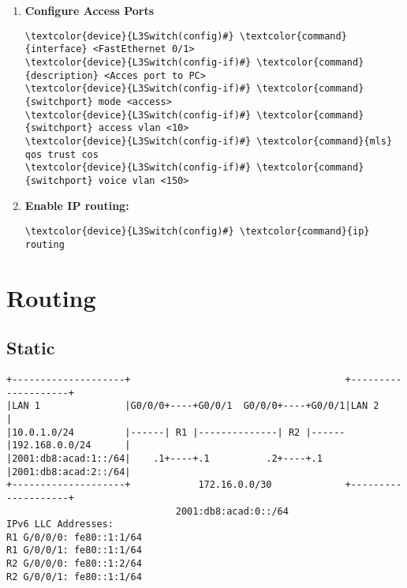 \documentclass[10pt, a4paper, onecolumn, oneside, titlepage, openany]{book}
\begin{document}
\begin{enumerate}
\begin{itemize}
\begin{Verbatim}[commandchars=\\\{\}]
\textcolor{device}{L3Switch(config-if)#} \textcolor{command}{description} <Default Gateway for VLAN 10>
\textcolor{device}{L3Switch(config-if)#} \textcolor{command}{ip} address <192.168.10.1> <255.255.255.0>
\textcolor{device}{L3Switch(config-if)#} \textcolor{command}{no} shut
\end{Verbatim}
    \item \textbf{Voice VLAN GW:}
\begin{Verbatim}[commandchars=\\\{\}]
\textcolor{device}{L3Switch(config)#} \textcolor{command}{interface} vlan <150>
\textcolor{device}{L3Switch(config-if)#} \textcolor{command}{description} <Default Gateway for VLAN 150>
\textcolor{device}{L3Switch(config-if)#} \textcolor{command}{ip} address <192.168.150.1> <255.255.255.0>
\textcolor{device}{L3Switch(config-if)#} \textcolor{command}{no} shut
\end{Verbatim}
\end{itemize}
    \item \textbf{Configure Access Ports}
\begin{Verbatim}[commandchars=\\\{\}]
\textcolor{device}{L3Switch(config)#} \textcolor{command}{interface} <FastEthernet 0/1>
\textcolor{device}{L3Switch(config-if)#} \textcolor{command}{description} <Acces port to PC>
\textcolor{device}{L3Switch(config-if)#} \textcolor{command}{switchport} mode <access>
\textcolor{device}{L3Switch(config-if)#} \textcolor{command}{switchport} access vlan <10>
\textcolor{device}{L3Switch(config-if)#} \textcolor{command}{mls} qos trust cos
\textcolor{device}{L3Switch(config-if)#} \textcolor{command}{switchport} voice vlan <150>
\end{Verbatim}
    \item \textbf{Enable IP routing:}
\begin{Verbatim}[commandchars=\\\{\}]
\textcolor{device}{L3Switch(config)#} \textcolor{command}{ip} routing
\end{Verbatim}
\end{enumerate}




\chapter{Routing}
\label{routing}
\section{Static}
\begin{verbatim}
+--------------------+                                      +--------------------+
|LAN 1               |G0/0/0+----+G0/0/1  G0/0/0+----+G0/0/1|LAN 2               |
|10.0.1.0/24         |------| R1 |--------------| R2 |------|192.168.0.0/24      |
|2001:db8:acad:1::/64|    .1+----+.1          .2+----+.1    |2001:db8:acad:2::/64|
+--------------------+            172.16.0.0/30             +--------------------+
                              2001:db8:acad:0::/64
IPv6 LLC Addresses:
R1 G/0/0/0: fe80::1:1/64
R1 G/0/0/1: fe80::1:1/64
R2 G/0/0/0: fe80::1:2/64
R2 G/0/0/1: fe80::1:1/64
\end{verbatim}
\end{document}

